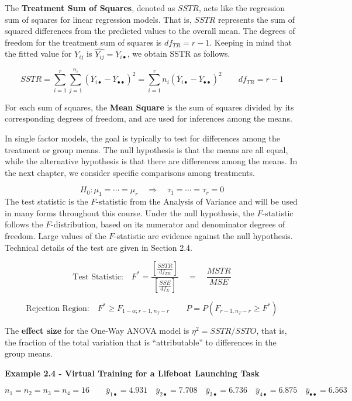\documentclass[
]{book}
\begin{document}
The \textbf{Treatment Sum of Squares}, denoted as \(SSTR\), acts like
the regression sum of squares for linear regression models. That is,
\(SSTR\) represents the sum of squared differences from the predicted
values to the overall mean. The degrees of freedom for the treatment sum
of squares is \(df_{TR}=r-1\). Keeping in mind that the fitted value for
\(Y_{ij}\) is \(\hat{Y_{ij}} = \overline{Y}_{i\bullet}\), we obtain SSTR
as follows.

\[
SSTR = \sum_{i=1}^r\sum_{j=1}^{n_i}
\left(\overline{Y}_{i\bullet}-
  \overline{Y}_{\bullet\bullet}\right)^2
 = \sum_{i=1}^r n_i \left(\overline{Y}_{i\bullet}-
  \overline{Y}_{\bullet\bullet}\right)^2 
\qquad df_{TR}=r-1
\]

For each sum of squares, the \textbf{Mean Square} is the sum of squares
divided by its corresponding degrees of freedom, and are used for
inferences among the means.

In single factor models, the goal is typically to test for differences
among the treatment or group means. The null hypothesis is that the
means are all equal, while the alternative hypothesis is that there are
differences among the means. In the next chapter, we consider specific
comparisons among treatments.

\[
H_0: \mu_1=\cdots = \mu_r \quad \Rightarrow \quad \tau_1=\cdots = \tau_r = 0
\] The test statistic is the \(F\)-statistic from the Analysis of
Variance and will be used in many forms throughout this course. Under
the null hypothesis, the \(F\)-statistic follows the \(F\)-distribution,
based on its numerator and denominator degrees of freedom. Large values
of the \(F\)-statistic are evidence against the null hypothesis.
Technical details of the test are given in Section 2.4.

\[
\mbox{Test Statistic:} \quad F^* = 
\frac{\left[\frac{SSTR}{df_{TR}}\right]}
{\left[\frac{SSE}{df_{E}}\right]}
\quad = \quad \frac{MSTR}{MSE} 
\]

\[
\mbox{Rejection Region:} \quad F^* \geq F_{1-\alpha;r-1,n_T-r}  \qquad
P=P\left(F_{r-1,n_T-r} \geq F^*\right)
\]

The \textbf{effect size} for the One-Way ANOVA model is
\(\eta^2=SSTR/SSTO\), that is, the fraction of the total variation that
is ``attributable'' to differences in the group means.

\textbf{Example 2.4 - Virtual Training for a Lifeboat Launching Task}

\[
n_1=n_2=n_3=n_4=16 \qquad \overline{y}_{1\bullet}=4.931 \quad
\overline{y}_{2\bullet}=7.708 \quad
\overline{y}_{3\bullet}=6.736 \quad
\overline{y}_{4\bullet}=6.875 \quad
\overline{y}_{\bullet\bullet}=6.563
\]
\end{document}
